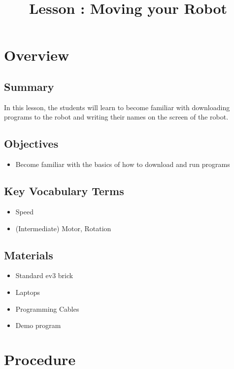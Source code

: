 \documentclass{lessonplan}
\title{Lesson \lessonNumber: Moving your Robot}
\author{\linkHome}
\date{}
\begin{document}
  \maketitle

  \section{Overview}
    \subsection{Summary}
      In this lesson, the students will learn to become familiar with downloading programs to the robot and writing their names on the screen of the robot.


    \subsection{Objectives}
    \begin{itemize}
      \item Become familiar with the basics of how to download and run programs
      

    \end{itemize}
    
    
    \subsection{Key Vocabulary Terms}
    \begin{itemize}
      \item Speed
      \item (Intermediate) Motor, Rotation
      
      
    \end{itemize}
    \subsection{Materials}
      \begin{itemize}
        \item Standard ev3 brick
        \item Laptops
        \item Programming Cables
        \item Demo program
      \end{itemize}
      
      
  \section{Procedure}
\end{document}
